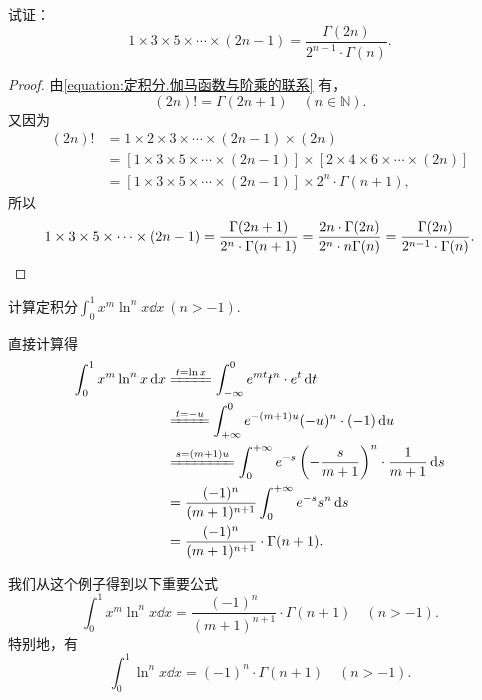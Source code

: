 \begin{example}
试证：\begin{equation}\label{equation:定积分.伽马函数与双阶乘的联系2}
1 \times 3 \times 5 \times\dotsm\times (2n-1) = \frac{\Gamma(2n)}{2^{n-1} \cdot \Gamma(n)}.
\end{equation}
\begin{proof}
由\cref{equation:定积分.伽马函数与阶乘的联系} 有，\[
(2n)! = \Gamma(2n+1) \quad(n\in\mathbb{N}).
\]又因为\[
\begin{split}
(2n)! &= 1 \times 2 \times 3 \times\dotsm\times (2n-1) \times (2n) \\
&= [1 \times 3 \times 5 \times\dotsm\times (2n-1)]
	\times [2 \times 4 \times 6 \times\dotsm\times (2n)] \\
&= [1 \times 3 \times 5 \times\dotsm\times (2n-1)] \times 2^n \cdot \Gamma(n+1),
\end{split}
\]所以\[
1 \times 3 \times 5 \times\dotsm\times (2n-1)
= \frac{\Gamma(2n+1)}{2^n \cdot \Gamma(n+1)} \\
= \frac{2n \cdot \Gamma(2n)}{2^n \cdot n\Gamma(n)}
= \frac{\Gamma(2n)}{2^{n-1} \cdot \Gamma(n)}.
\qedhere
\]
\end{proof}
\end{example}

\begin{example}
计算定积分\(\int_0^1 x^m \ln^n x \dd{x}\ (n>-1)\).
\begin{solution}
直接计算得
\begin{align*}
\int_0^1 x^m \ln^n x \dd{x}
&\xlongequal{t=\ln x}
\int_{-\infty}^0 e^{mt} t^n \cdot e^t \dd{t} \\
&\xlongequal{t=-u}
\int_{+\infty}^0 e^{-(m+1)u} (-u)^n \cdot (-1) \dd{u} \\
&\xlongequal{s=(m+1)u}
\int_0^{+\infty} e^{-s} \left(-\frac{s}{m+1}\right)^n \cdot \frac{1}{m+1} \dd{s} \\
&=
\frac{(-1)^n}{(m+1)^{n+1}} \int_0^{+\infty} e^{-s} s^n \dd{s} \\
&=
\frac{(-1)^n}{(m+1)^{n+1}} \cdot \Gamma(n+1).
\end{align*}
\end{solution}
\end{example}
我们从这个例子得到以下重要公式
\begin{equation}
\int_0^1 x^m \ln^n x \dd{x}
= \frac{(-1)^n}{(m+1)^{n+1}} \cdot \Gamma(n+1)
\quad(n>-1).
\end{equation}
特别地，有
\begin{equation}
\int_0^1 \ln^n x \dd{x}
= (-1)^n \cdot \Gamma(n+1)
\quad(n>-1).
\end{equation}

